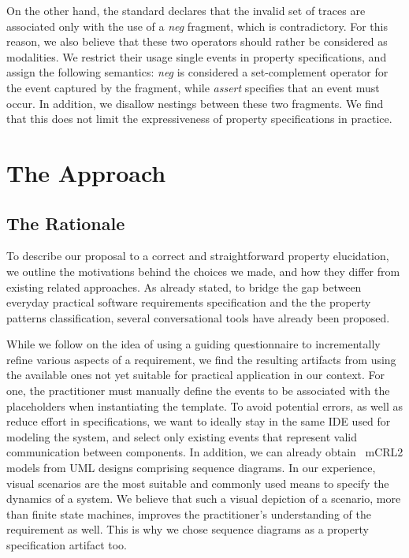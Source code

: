\documentclass[letter]{llncs}
\begin{document}
On the other hand, the standard declares that the
invalid set of traces are associated only with the use of
a \emph{neg} fragment, which is contradictory.
For this reason, we also believe that these two operators should rather be considered 
as modalities. We restrict their usage single events in property specifications, and assign the following semantics:
\emph{neg} is considered a set-complement operator for the event captured by the fragment, while \emph{assert}
specifies that an event must occur. In addition, we
disallow nestings between these two fragments.
We find that this does not limit the expressiveness of property specifications in practice.
\section{The Approach}
\label{sec:Approach}

\subsection{The Rationale}
To describe our proposal to a correct and straightforward property elucidation,
we outline the motivations behind the choices we made, and how they differ from
existing related approaches. As already stated, to bridge the gap between everyday practical software 
requirements specification and the the property patterns classification,
several conversational tools have already been proposed. 

While we follow 
on the idea of using a guiding questionnaire to incrementally refine various aspects
of a requirement, we find the resulting artifacts from using the available ones 
not yet suitable for practical application in our context.
For one, the practitioner must manually define the events to be associated with the placeholders when 
instantiating the template. To avoid potential errors, as well as
reduce effort in specifications, we want to ideally stay in the same IDE used
for modeling the system, and select only existing events that represent
valid communication between components.  
In addition, we can already obtain~\cite{DBLP:dblp_conf/nfm/RemenskaTWHVCB13} mCRL2 models from UML designs comprising sequence diagrams.
In our experience, visual scenarios are the most suitable and commonly used  
means to specify the dynamics of a system. 
We believe that such a visual depiction of a scenario, more than finite state machines, 
improves the practitioner's understanding of the requirement as well. 
This is why we chose sequence diagrams as a property specification artifact too.
\end{document}
